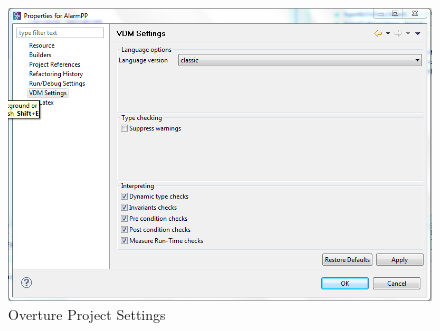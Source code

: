 \documentclass{overturerepchap}
\begin{document}
\begin{figure}[!hbt]
\begin{center}
  \includegraphics[width=\textwidth]{screendumps/projectsettings}
  \caption[Overture Project Settings]{Overture Project Settings}
  \label{fig:VDMSettings}
\end{center}
\end{figure}
\end{document}
